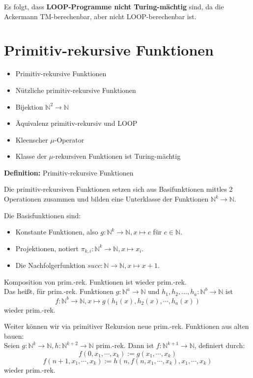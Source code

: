 \documentclass[a4paper,graphics,11pt]{article}
\begin{document}
Es folgt, dass \textbf{LOOP-Programme nicht Turing-mächtig} sind, da die Ackermann TM-berechenbar,
aber nicht LOOP-berechenbar ist.



\newpage



\section{Primitiv-rekursive Funktionen}

\begin{itemize}
    \item Primitiv-rekursive Funktionen
    \item Nützliche primitiv-rekursive Funktionen
    \item Bijektion $\mathbb{N}^2 \to \mathbb{N}$
    \item Äquivalenz primitiv-rekursiv und LOOP
    \item Kleenscher $\mu$-Operator
    \item Klasse der $\mu$-rekursiven Funktionen ist Turing-mächtig
\end{itemize}

\textbf{Definition:} Primitiv-rekursive Funktionen

Die primitiv-rekursiven Funktionen setzen sich aus Basifunktionen mittles 2 Operationen
zusammen und bilden eine Unterklasse der Funktionen $\mathbb{N}^k \to \mathbb{N}$.

Die Basisfunktionen sind:
\begin{itemize}
    \item Konstante Funktionen, also $g: \mathbb{N}^k \to \mathbb{N}, x \mapsto c$ für $c \in \mathbb{N}$.
    \item Projektionen, notiert $\pi_{k,i}: \mathbb{N}^k \to \mathbb{N}, x \mapsto x_i$.
    \item Die Nachfolgerfunktion $succ : \mathbb{N} \to \mathbb{N}, x \mapsto x+1$.
\end{itemize}
Komposition von prim.-rek. Funktionen ist wieder prim.-rek.\\
Das heißt, für prim.-rek. Funktionen
$g : \mathbb{N}^a \to \mathbb{N}$ und $h_1,h_2,\dots,h_a : \mathbb{N}^b \to \mathbb{N}$ ist
$$
    f: \mathbb{N}^b \to \mathbb{N}, x \mapsto g(h_1(x), h_2(x), \cdots, h_a(x))
$$
wieder prim.-rek.

Weiter können wir via primitiver Rekursion neue prim.-rek. Funktionen aus alten bauen:\\
Seien $g: \mathbb{N}^k \to \mathbb{N}, h: \mathbb{N}^{k+2} \to \mathbb{N}$ prim.-rek.
Dann ist $f: \mathbb{N}^{k+1} \to \mathbb{N}$, definiert durch:
$$
    f(0,x_1,\cdots,x_k) := g(x_1,\cdots,x_k)
$$$$
    f(n+1,x_1,\cdots,x_k) := h(n, f(n,x_1,\cdots,x_k), x_1,\cdots,x_k)
$$
wieder prim.-rek.
\end{document}
